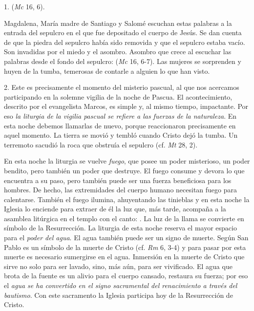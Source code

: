 \begin{body}
1.  (\textit{Mc} 16, 6). 

 Magdalena, María madre de Santiago y Salomé escuchan estas palabras a la entrada del sepulcro en el que fue depositado el cuerpo de Jesús. Se dan cuenta de que la piedra del sepulcro había sido removida y que el sepulcro estaba vacío. Son invadidas por el miedo y el asombro. Asombro que crece al escuchar las palabras desde el fondo del sepulcro:  (\textit{Mc} 16, 6-7). Las mujeres se sorprenden y huyen de la tumba, temerosas de contarle a alguien lo que han visto. 

2. Este es precisamente el momento del misterio pascual, al que nos acercamos participando en la solemne vigilia de la noche de Pascua. El acontecimiento, descrito por el evangelista Marcos, es simple y, al mismo tiempo, impactante.  Por eso \textit{la liturgia de la vigilia pascual se refiere a las fuerzas de la naturaleza}. En esta noche debemos llamarlas de nuevo, porque reaccionaron precisamente en aquel momento. La tierra se movió y tembló cuando Cristo dejó la tumba. Un terremoto sacudió la roca que obstruía el sepulcro (cf. \textit{Mt} 28, 2). 

En esta noche la liturgia se vuelve \textit{fuego}, que posee un poder misterioso, un poder bendito, pero también un poder que destruye. El fuego consume y devora lo que encuentra a su paso, pero también puede ser una fuerza beneficiosa para los hombres. De hecho, las extremidades del cuerpo humano necesitan fuego para calentarse. También el fuego ilumina, ahuyentando las tinieblas y en esta noche la Iglesia lo enciende para extraer de él la luz que, más tarde, acompaña a la asamblea litúrgica en el templo con el canto: . La luz de la llama se convierte en símbolo de la Resurrección. La liturgia de esta noche reserva el mayor espacio para el\textit{ poder del agua}. El agua también puede ser un signo de muerte. Según San Pablo es un símbolo de la muerte de Cristo (cf. \textit{Rm} 6, 3-4) y para pasar por esta muerte es necesario sumergirse en el agua. Inmersión en la muerte de Cristo que sirve no solo para ser lavado, sino, más aún, para ser vivificado. El agua que brota de la fuente es un alivio para el cuerpo cansado, restaura su fuerza; por eso el \textit{agua se ha convertido en el signo sacramental del renacimiento a través del bautismo}. Con este sacramento la Iglesia participa hoy de la Resurrección de Cristo. 


\end{body}
